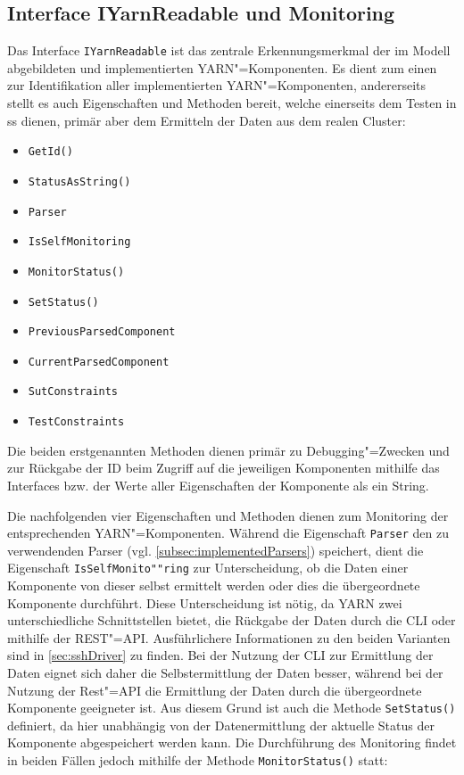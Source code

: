\subsection{Interface IYarnReadable und Monitoring}
\label{subsec:yarnComponentInterface}

Das Interface \texttt{IYarnReadable} ist das zentrale Erkennungsmerkmal der im Modell abgebildeten und implementierten \gls{YARN}"=Komponenten.
Es dient zum einen zur Identifikation aller implementierten \gls{YARN}"=Komponenten, andererseits stellt es auch Eigenschaften und Methoden bereit, welche einerseits dem Testen in \gls{ss} dienen, primär aber dem Ermitteln der Daten aus dem realen Cluster:

\begin{itemize}
    \item \texttt{GetId()}
    \item \texttt{StatusAsString()}
    
    \item \texttt{Parser}
    \item \texttt{IsSelfMonitoring}
    \item \texttt{MonitorStatus()}
    \item \texttt{SetStatus()}
    
    \item \texttt{PreviousParsedComponent}
    \item \texttt{CurrentParsedComponent}
    \item \texttt{SutConstraints}
    \item \texttt{TestConstraints}
\end{itemize}

Die beiden erstgenannten Methoden dienen primär zu Debugging"=Zwecken und zur Rückgabe der ID beim Zugriff auf die jeweiligen Komponenten mithilfe das Interfaces bzw. der Werte aller Eigenschaften der Komponente als ein String.

Die nachfolgenden vier Eigenschaften und Methoden dienen zum Monitoring der entsprechenden \gls{YARN}"=Komponenten.
Während die Eigenschaft \texttt{Parser} den zu verwendenden Parser (vgl. \cref{subsec:implementedParsers}) speichert, dient die Eigenschaft \texttt{IsSelfMonito""ring} zur Unterscheidung, ob die Daten einer Komponente von dieser selbst ermittelt werden oder dies die übergeordnete Komponente durchführt.
Diese Unterscheidung ist nötig, da \gls{YARN} zwei unterschiedliche Schnittstellen bietet, die Rückgabe der Daten durch die \gls{CLI} oder mithilfe der \gls{REST}"=API.
Ausführlichere Informationen zu den beiden Varianten sind in \cref{sec:sshDriver} zu finden.
Bei der Nutzung der \gls{CLI} zur Ermittlung der Daten eignet sich daher die Selbstermittlung der Daten besser, während bei der Nutzung der Rest"=API die Ermittlung der Daten durch die übergeordnete Komponente geeigneter ist.
Aus diesem Grund ist auch die Methode \texttt{SetStatus()} definiert, da hier unabhängig von der Datenermittlung der aktuelle Status der Komponente abgespeichert werden kann.
Die Durchführung des Monitoring findet in beiden Fällen jedoch mithilfe der Methode \texttt{MonitorStatus()} statt:

